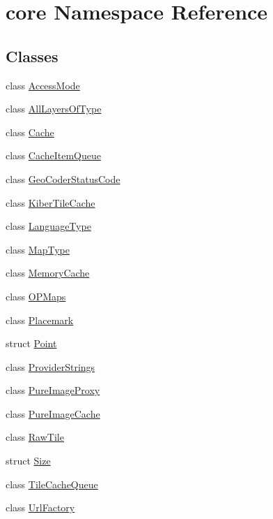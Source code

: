 \hypertarget{namespacecore}{\section{core \-Namespace \-Reference}
\label{namespacecore}
}
\subsection*{\-Classes}
\begin{DoxyCompactItemize}
\item 
class \hyperlink{classcore_1_1_access_mode}{\-Access\-Mode}
\item 
class \hyperlink{classcore_1_1_all_layers_of_type}{\-All\-Layers\-Of\-Type}
\item 
class \hyperlink{classcore_1_1_cache}{\-Cache}
\item 
class \hyperlink{classcore_1_1_cache_item_queue}{\-Cache\-Item\-Queue}
\item 
class \hyperlink{classcore_1_1_geo_coder_status_code}{\-Geo\-Coder\-Status\-Code}
\item 
class \hyperlink{classcore_1_1_kiber_tile_cache}{\-Kiber\-Tile\-Cache}
\item 
class \hyperlink{classcore_1_1_language_type}{\-Language\-Type}
\item 
class \hyperlink{classcore_1_1_map_type}{\-Map\-Type}
\item 
class \hyperlink{classcore_1_1_memory_cache}{\-Memory\-Cache}
\item 
class \hyperlink{classcore_1_1_o_p_maps}{\-O\-P\-Maps}
\item 
class \hyperlink{classcore_1_1_placemark}{\-Placemark}
\item 
struct \hyperlink{structcore_1_1_point}{\-Point}
\item 
class \hyperlink{classcore_1_1_provider_strings}{\-Provider\-Strings}
\item 
class \hyperlink{classcore_1_1_pure_image_proxy}{\-Pure\-Image\-Proxy}
\item 
class \hyperlink{classcore_1_1_pure_image_cache}{\-Pure\-Image\-Cache}
\item 
class \hyperlink{classcore_1_1_raw_tile}{\-Raw\-Tile}
\item 
struct \hyperlink{structcore_1_1_size}{\-Size}
\item 
class \hyperlink{classcore_1_1_tile_cache_queue}{\-Tile\-Cache\-Queue}
\item 
class \hyperlink{classcore_1_1_url_factory}{\-Url\-Factory}
\end{DoxyCompactItemize}
